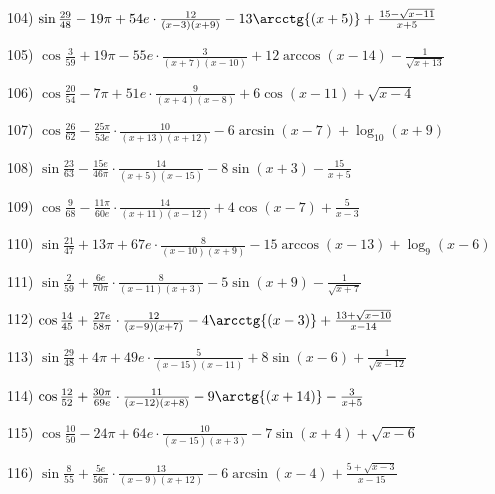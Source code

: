 \documentclass[11pt,ukrainian]{article}
\begin{document}
104) \space 
{ ${\sin\frac{29}{48}} - 19{\pi} + 54 e\cdot {\frac{12}{(x - 3)(x + 9)}} - {13\arcctg{(x + 5)}} + {\frac{15 - \sqrt{x - 11}}{x + 5}}$}
\smallskip\par
105) \space 
{ ${\cos\frac{3}{59}} + 19{\pi} - 55 e\cdot {\frac{3}{(x + 7)(x - 10)}} + {12\arccos{(x - 14)}} - {\frac{1}{\sqrt{x + 13}}}$}
\smallskip\par
106) \space 
{ ${\cos\frac{20}{54}} - 7{\pi} + 51 e\cdot {\frac{9}{(x + 4)(x - 8)}} + {6\cos{(x - 11)}} + {\sqrt{x - 4}}$}
\smallskip\par
107) \space 
{ ${\cos\frac{26}{62}} - \frac{25{\pi}}{53 e}\cdot {\frac{10}{(x + 13)(x + 12)}} - {6\arcsin{(x - 7)}} + {\log_{10}(x + 9)}$}
\smallskip\par
108) \space 
{ ${\sin\frac{23}{63}} - \frac{15 e}{46{\pi}}\cdot {\frac{14}{(x + 5)(x - 15)}} - {8\sin{(x + 3)}} - { \frac{15}{x + 5}}$}
\smallskip\par
109) \space 
{ ${\cos\frac{9}{68}} - \frac{11{\pi}}{60 e}\cdot {\frac{14}{(x + 11)(x - 12)}} + {4\cos{(x - 7)}} + { \frac{5}{x - 3}}$}
\smallskip\par
110) \space 
{ ${\sin\frac{21}{47}} + 13{\pi} + 67 e\cdot {\frac{8}{(x - 10)(x + 9)}} - {15\arccos{(x - 13)}} + {\log_{9}(x - 6)}$}
\smallskip\par
111) \space 
{ ${\sin\frac{2}{59}} + \frac{6 e}{70{\pi}}\cdot {\frac{8}{(x - 11)(x + 3)}} - {5\sin{(x + 9)}} - {\frac{1}{\sqrt{x + 7}}}$}
\smallskip\par
112) \space 
{ ${\cos\frac{14}{45}} + \frac{27 e}{58{\pi}}\cdot {\frac{12}{(x - 9)(x + 7)}} - {4\arcctg{(x - 3)}} + {\frac{13 + \sqrt{x - 10}}{x - 14}}$}
\smallskip\par
113) \space 
{ ${\sin\frac{29}{48}} + 4{\pi} + 49 e\cdot {\frac{5}{(x - 15)(x - 11)}} + {8\sin{(x - 6)}} + {\frac{1}{\sqrt{x - 12}}}$}
\smallskip\par
114) \space 
{ ${\cos\frac{12}{52}} + \frac{30{\pi}}{69 e}\cdot {\frac{11}{(x - 12)(x + 8)}} - {9\arctg{(x + 14)}} - { \frac{3}{x + 5}}$}
\smallskip\par
115) \space 
{ ${\cos\frac{10}{50}} - 24{\pi} + 64 e\cdot {\frac{10}{(x - 15)(x + 3)}} - {7\sin{(x + 4)}} + {\sqrt{x - 6}}$}
\smallskip\par
116) \space 
{ ${\sin\frac{8}{55}} + \frac{5 e}{56{\pi}}\cdot {\frac{13}{(x - 9)(x + 12)}} - {6\arcsin{(x - 4)}} + {\frac{5 + \sqrt{x - 3}}{x - 15}}$}
\end{document}
